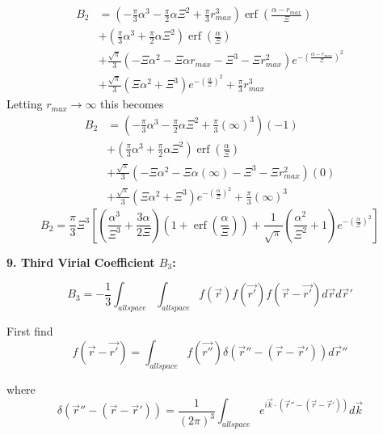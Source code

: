 \documentclass[12pt]{article}
\begin{document}
\begin{align}
  B_2 &= \left(-\frac{\pi}{3}\alpha^3-\frac{\pi}{2}\alpha\Xi^2+\frac{\pi}{3}r_{max}^3\right)\operatorname{erf}\left(\frac{\alpha-r_{max}}{\Xi}\right) \\
      &+ \left(\frac{\pi}{3}\alpha^3+\frac{\pi}{2}\alpha\Xi^2\right)\operatorname{erf}\left(\frac{\alpha}{\Xi}\right) \\
      &+ \frac{\sqrt{\pi}}{3}\left(-\Xi\alpha^2-\Xi\alpha r_{max}-\Xi^3-\Xi r_{max}^2\right)e^{-{\left(\frac{\alpha-r_{max}}{\Xi}\right)^2}} \\
      &+ \frac{\sqrt{\pi}}{3}\left(\Xi\alpha^2+\Xi^3\right)e^{-\left(\frac{\alpha}{\Xi}\right)^2}+\frac{\pi}{3}r_{max}^3 
\end{align}
Letting $r_{max}\rightarrow\infty$ this becomes
\begin{align}
  B_2 &= \left(-\frac{\pi}{3}\alpha^3-\frac{\pi}{2}\alpha\Xi^2+\frac{\pi}{3}\left(\infty\right)^3\right)\left(-1\right) \\
      &+ \left(\frac{\pi}{3}\alpha^3+\frac{\pi}{2}\alpha\Xi^2\right)\operatorname{erf}\left(\frac{\alpha}{\Xi}\right) \\
      &+ \frac{\sqrt{\pi}}{3}\left(-\Xi\alpha^2-\Xi\alpha\left(\infty\right)-\Xi^3-\Xi r_{max}^2\right)\left(0\right) \\
      &+ \frac{\sqrt{\pi}}{3}\left(\Xi\alpha^2+\Xi^3\right)e^{-\left(\frac{\alpha}{\Xi}\right)^2}+\frac{\pi}{3}\left(\infty\right)^3 
\end{align}
\begin{equation}B_2 = \frac{\pi}{3}\Xi^3\left[\left(\frac{\alpha^3}{\Xi^3}+\frac{3\alpha}{2\Xi}\right)\left(1+\operatorname{erf}\left(\frac{\alpha}{\Xi}\right)\right)+\frac{1}{\sqrt{\pi}}\left(\frac{\alpha^2}{\Xi^2}+1\right)e^{-\left(\frac{\alpha}{\Xi}\right)^2}\right]\end{equation}

\[{}\]
\textbf{9. Third Virial Coefficient $B_{3}$:}

\begin{equation}\label{B3}B_3=-\frac{1}{3}\int_{allspace}\int_{allspace}f(\vec{r})f(\vec{r'})f(\vec{r}-\vec{r'})d\vec rd\vec r'\end{equation}

First find
\begin{equation}f(\vec{r}-\vec{r'})=\int_{allspace}f(\vec{r''})\delta(\vec{r}''-(\vec{r}-\vec{r}'))d\vec r'' \end{equation}

where
\begin{equation}{\delta}(\vec{r}''-(\vec{r}-\vec{r}'))={ \frac{1}{\left(2\pi\right)^3}\int_{allspace} e^{i\vec k\cdot (\vec{r}''-(\vec r-\vec r'))}d\vec{k}}\end{equation} 
\end{document}
